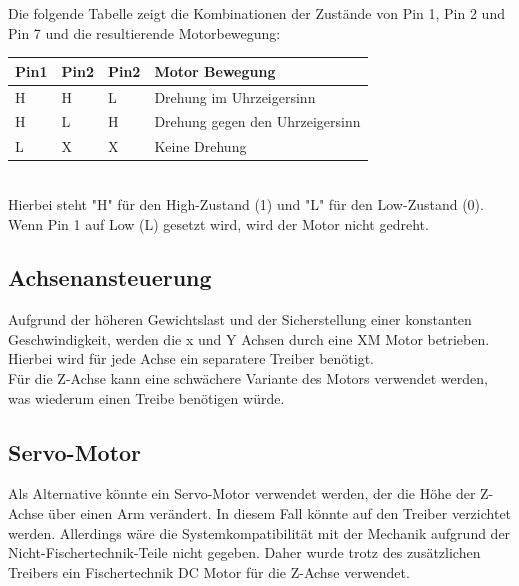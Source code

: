\documentclass[conference,compsoc,final,a4paper]{IEEEtran}
\begin{document}
\noindent Die folgende Tabelle zeigt die Kombinationen der Zustände von Pin 1, Pin 2 und Pin 7 und die resultierende Motorbewegung:
\begin{table}[]
  \begin{tabular}{llll}
  \textbf{Pin1} & \textbf{Pin2} & \textbf{Pin2} & \textbf{Motor Bewegung}         \\ \hline
  H             & H             & L             & Drehung im Uhrzeigersinn        \\
  H             & L             & H             & Drehung gegen den Uhrzeigersinn \\
  L             & X             & X             & Keine Drehung                   \\ 
  \end{tabular}
\end{table}
\\

\noindent Hierbei steht "H" für den High-Zustand (1) und "L" für den Low-Zustand (0). Wenn Pin 1 auf Low (L) gesetzt wird, wird der Motor nicht gedreht.

\subsection{Achsenansteuerung}

Aufgrund der höheren Gewichtslast und der Sicherstellung einer konstanten Geschwindigkeit, werden die x und Y Achsen durch eine XM Motor betrieben.
Hierbei wird für jede Achse ein separatere Treiber benötigt.
\\

\noindent Für die Z-Achse kann eine schwächere Variante des Motors verwendet werden, was wiederum einen Treibe benötigen würde.

\subsection{Servo-Motor}

Als Alternative könnte ein Servo-Motor verwendet werden, der die Höhe der Z-Achse über einen Arm verändert. 
In diesem Fall könnte auf den Treiber verzichtet werden. Allerdings wäre die Systemkompatibilität mit der Mechanik aufgrund der Nicht-Fischertechnik-Teile nicht gegeben. 
Daher wurde trotz des zusätzlichen Treibers ein Fischertechnik DC Motor für die Z-Achse verwendet.
\end{document}

